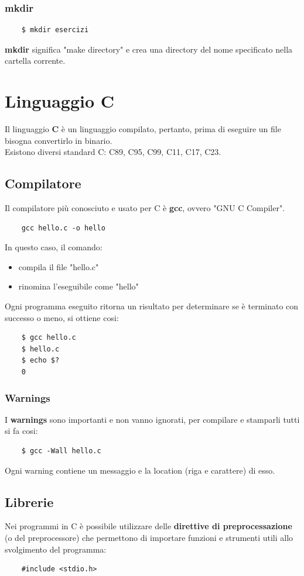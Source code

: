\documentclass[12pt,a4paper]{article}
\let\oldsection\section
\renewcommand{\section}{\clearpage\oldsection}
\begin{document}
\subsubsection{mkdir}
\begin{lstlisting}
    $ mkdir esercizi
\end{lstlisting}
\textbf{mkdir} significa "make directory" e crea una directory del nome specificato nella cartella corrente.
\section{Linguaggio C}
Il linguaggio \textbf{C} è un linguaggio compilato, pertanto, prima di eseguire un file bisogna convertirlo in binario.\\
Esistono diversi standard C: C89, C95, C99, C11, C17, C23.\\
\subsection{Compilatore}
Il compilatore più conosciuto e usato per C è \textbf{gcc}, ovvero "GNU C Compiler".
\begin{lstlisting}
    gcc hello.c -o hello
\end{lstlisting}
In questo caso, il comando:
\begin{itemize}
    \item compila il file "hello.c"
    \item rinomina l'eseguibile come "hello"
\end{itemize}
Ogni programma eseguito ritorna un risultato per determinare se è terminato con successo o meno, si ottiene cosi:
\begin{lstlisting}
    $ gcc hello.c
    $ hello.c
    $ echo $?
    0
\end{lstlisting}
\subsubsection{Warnings}
I \textbf{warnings} sono importanti e non vanno ignorati, per compilare e stamparli tutti si fa cosi:
\begin{lstlisting}
    $ gcc -Wall hello.c
\end{lstlisting}
Ogni warning contiene un messaggio e la location (riga e carattere) di esso.
\subsection{Librerie}
Nei programmi in C è possibile utilizzare delle \textbf{direttive di preprocessazione} (o del preprocessore) che permettono di importare funzioni e strumenti utili allo svolgimento del programma:
\begin{lstlisting}
    #include <stdio.h>
\end{lstlisting}
\end{document}
